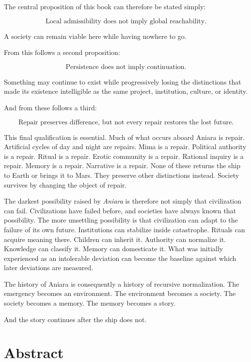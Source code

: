 \documentclass[11pt,oneside]{book}
\theoremstyle{definition}
\theoremstyle{remark}
\begin{document}
The central proposition of this book can therefore be stated simply:

\[
\boxed{
\text{Local admissibility does not imply global reachability.}
}
\]

A society can remain viable here while having nowhere to go.

From this follows a second proposition:

\[
\boxed{
\text{Persistence does not imply continuation.}
}
\]

Something may continue to exist while progressively losing the distinctions that made its existence intelligible as the same project, institution, culture, or identity.

And from these follows a third:

\[
\boxed{
\text{Repair preserves difference, but not every repair restores the lost future.}
}
\]

This final qualification is essential. Much of what occurs aboard Aniara is repair. Artificial cycles of day and night are repairs. Mima is a repair. Political authority is a repair. Ritual is a repair. Erotic community is a repair. Rational inquiry is a repair. Memory is a repair. Narrative is a repair. None of these returns the ship to Earth or brings it to Mars. They preserve other distinctions instead. Society survives by changing the object of repair.

The darkest possibility raised by \emph{Aniara} is therefore not simply that civilization can fail. Civilizations have failed before, and societies have always known that possibility. The more unsettling possibility is that civilization can adapt to the failure of its own future. Institutions can stabilize inside catastrophe. Rituals can acquire meaning there. Children can inherit it. Authority can normalize it. Knowledge can classify it. Memory can domesticate it. What was initially experienced as an intolerable deviation can become the baseline against which later deviations are measured.

The history of Aniara is consequently a history of recursive normalization. The emergency becomes an environment. The environment becomes a society. The society becomes a memory. The memory becomes a story.

And the story continues after the ship does not.

\chapter*{Abstract}
\end{document}
